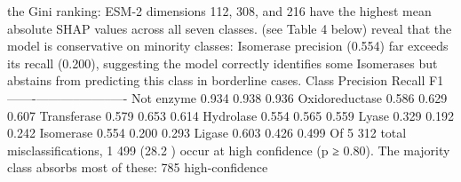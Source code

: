 {}the Gini ranking: ESM-2 dimensions 112, 308, and 216 have the highest mean absolute SHAP\markdownRendererSoftLineBreak
{}values across all seven classes.\markdownRendererParagraphSeparator
{} (see Table 4 below) reveal that the model is\markdownRendererSoftLineBreak
{}conservative on minority classes: Isomerase precision (0.554) far exceeds its recall (0.200),\markdownRendererSoftLineBreak
{}suggesting the model correctly identifies some Isomerases but abstains from predicting this\markdownRendererSoftLineBreak
{}class in borderline cases.\markdownRendererParagraphSeparator
{}\markdownRendererPipe{} Class \markdownRendererPipe{} Precision \markdownRendererPipe{} Recall \markdownRendererPipe{} F1 \markdownRendererPipe{}\markdownRendererSoftLineBreak
{}\markdownRendererPipe{}-------\markdownRendererPipe{}-----------\markdownRendererPipe{}--------\markdownRendererPipe{}----\markdownRendererPipe{}\markdownRendererSoftLineBreak
{}\markdownRendererPipe{} Not enzyme \markdownRendererPipe{} 0.934 \markdownRendererPipe{} 0.938 \markdownRendererPipe{} 0.936 \markdownRendererPipe{}\markdownRendererSoftLineBreak
{}\markdownRendererPipe{} Oxidoreductase \markdownRendererPipe{} 0.586 \markdownRendererPipe{} 0.629 \markdownRendererPipe{} 0.607 \markdownRendererPipe{}\markdownRendererSoftLineBreak
{}\markdownRendererPipe{} Transferase \markdownRendererPipe{} 0.579 \markdownRendererPipe{} 0.653 \markdownRendererPipe{} 0.614 \markdownRendererPipe{}\markdownRendererSoftLineBreak
{}\markdownRendererPipe{} Hydrolase \markdownRendererPipe{} 0.554 \markdownRendererPipe{} 0.565 \markdownRendererPipe{} 0.559 \markdownRendererPipe{}\markdownRendererSoftLineBreak
{}\markdownRendererPipe{} Lyase \markdownRendererPipe{} 0.329 \markdownRendererPipe{} 0.192 \markdownRendererPipe{} 0.242 \markdownRendererPipe{}\markdownRendererSoftLineBreak
{}\markdownRendererPipe{} Isomerase \markdownRendererPipe{} 0.554 \markdownRendererPipe{} 0.200 \markdownRendererPipe{} 0.293 \markdownRendererPipe{}\markdownRendererSoftLineBreak
{}\markdownRendererPipe{} Ligase \markdownRendererPipe{} 0.603 \markdownRendererPipe{} 0.426 \markdownRendererPipe{} 0.499 \markdownRendererPipe{}\markdownRendererParagraphSeparator
{}\markdownRendererParagraphSeparator
{} Of 5 312 total misclassifications, 1 499 (28.2 \markdownRendererPercentSign{}) occur at\markdownRendererSoftLineBreak
{}high confidence (p ≥ 0.80). The majority class absorbs most of these: 785 high-confidence\markdownRendererSoftLineBreak
